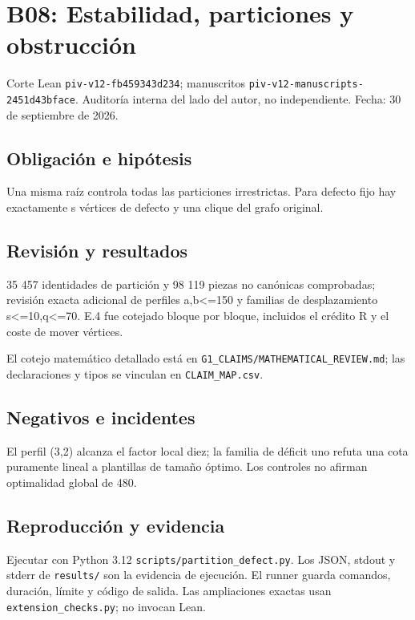 \section{B08: Estabilidad, particiones y
obstrucción}\label{b08-estabilidad-particiones-y-obstrucciuxf3n}

Corte Lean \texttt{piv-v12-fb459343d234}; manuscritos
\texttt{piv-v12-manuscripts-2451d43bface}. Auditoría interna del lado
del autor, no independiente. Fecha: 30 de septiembre de 2026.

\subsection{Obligación e hipótesis}\label{obligaciuxf3n-e-hipuxf3tesis}

Una misma raíz controla todas las particiones irrestrictas. Para defecto
fijo hay exactamente s vértices de defecto y una clique del grafo
original.

\subsection{Revisión y resultados}\label{revisiuxf3n-y-resultados}

35 457 identidades de partición y 98 119 piezas no canónicas
comprobadas; revisión exacta adicional de perfiles a,b\textless=150 y
familias de desplazamiento s\textless=10,q\textless=70. E.4 fue cotejado
bloque por bloque, incluidos el crédito R y el coste de mover vértices.

El cotejo matemático detallado está en
\texttt{G1\_CLAIMS/MATHEMATICAL\_REVIEW.md}; las declaraciones y tipos
se vinculan en \texttt{CLAIM\_MAP.csv}.

\subsection{Negativos e incidentes}\label{negativos-e-incidentes}

El perfil (3,2) alcanza el factor local diez; la familia de déficit uno
refuta una cota puramente lineal a plantillas de tamaño óptimo. Los
controles no afirman optimalidad global de 480.

\subsection{Reproducción y evidencia}\label{reproducciuxf3n-y-evidencia}

Ejecutar con Python 3.12 \texttt{scripts/partition\_defect.py}. Los
JSON, stdout y stderr de \texttt{results/} son la evidencia de
ejecución. El runner guarda comandos, duración, límite y código de
salida. Las ampliaciones exactas usan \texttt{extension\_checks.py}; no
invocan Lean.

